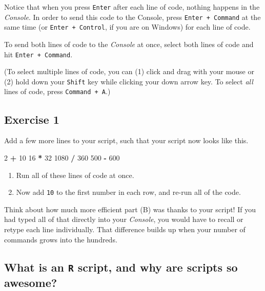 \documentclass[
]{book}
\newenvironment{Shaded}{\begin{snugshade}}{\end{snugshade}}
\newcommand{\DecValTok}[1]{\textcolor[rgb]{0.00,0.00,0.81}{#1}}
\newcommand{\OperatorTok}[1]{\textcolor[rgb]{0.81,0.36,0.00}{\textbf{#1}}}
\newcommand{\StringTok}[1]{\textcolor[rgb]{0.31,0.60,0.02}{#1}}
\providecommand{\tightlist}{%
  \setlength{\itemsep}{0pt}\setlength{\parskip}{0pt}}
\begin{document}
Notice that when you press \texttt{Enter} after each line of code, nothing happens in the \emph{Console}. In order to send this code to the Console, press \texttt{Enter\ +\ Command} at the same time (or \texttt{Enter\ +\ Control}, if you are on Windows) for each line of code.

To send both lines of code to the \emph{Console} at once, select both lines of code and hit \texttt{Enter\ +\ Command}.

(To select multiple lines of code, you can (1) click and drag with your mouse or (2) hold down your \texttt{Shift} key while clicking your down arrow key. To select \emph{all} lines of code, press \texttt{Command\ +\ A}.)

\hypertarget{exercise-1-1}{%
\subsection*{Exercise 1}\label{exercise-1-1}}

Add a few more lines to your script, such that your script now looks like this.

\begin{Shaded}
\begin{Highlighting}[]
\DecValTok{2}  \OperatorTok{+}\StringTok{ }\DecValTok{10}
\DecValTok{16} \OperatorTok{*}\StringTok{ }\DecValTok{32}
\DecValTok{1080} \OperatorTok{/}\StringTok{ }\DecValTok{360}
\DecValTok{500} \OperatorTok{-}\StringTok{ }\DecValTok{600}
\end{Highlighting}
\end{Shaded}

\begin{enumerate}
\def\labelenumi{(\Alph{enumi})}
\tightlist
\item
  Run all of these lines of code at once.\\
\item
  Now add \texttt{10} to the first number in each row, and re-run all of the code.
\end{enumerate}

Think about how much more efficient part (B) was thanks to your script! If you had typed all of that directly into your \emph{Console}, you would have to recall or retype each line individually. That difference builds up when your number of commands grows into the hundreds.

\hypertarget{what-is-an-r-script-and-why-are-scripts-so-awesome}{%
\subsection*{\texorpdfstring{What is an \texttt{R} script, and why are scripts so awesome?}{What is an R script, and why are scripts so awesome?}}\label{what-is-an-r-script-and-why-are-scripts-so-awesome}}
\end{document}
